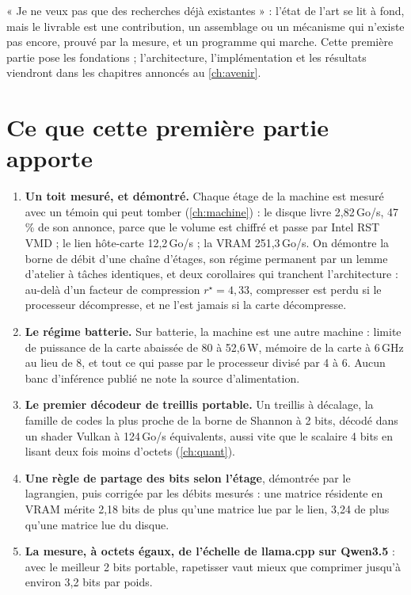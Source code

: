« Je ne veux pas que des recherches déjà existantes » : l'état de l'art se lit à fond, mais le livrable est une contribution, un assemblage ou un mécanisme qui n'existe pas encore, prouvé par la mesure, et un programme qui marche. Cette première partie pose les fondations ; l'architecture, l'implémentation et les résultats viendront dans les chapitres annoncés au \cref{ch:avenir}.

\section{Ce que cette première partie apporte}\label{sec:contributions}

\begin{enumerate}
\item \textbf{Un toit mesuré, et démontré.} Chaque étage de la machine est mesuré avec un témoin qui peut tomber (\cref{ch:machine}) : le disque livre 2,82\,Go/s, 47\,\% de son annonce, parce que le volume est chiffré et passe par Intel RST VMD ; le lien hôte-carte 12,2\,Go/s ; la VRAM 251,3\,Go/s. On démontre la borne de débit d'une chaîne d'étages, son régime permanent par un lemme d'atelier à tâches identiques, et deux corollaires qui tranchent l'architecture : au-delà d'un facteur de compression $r^\star = 4{,}33$, compresser est perdu si le processeur décompresse, et ne l'est jamais si la carte décompresse.
\item \textbf{Le régime batterie.} Sur batterie, la machine est une autre machine : limite de puissance de la carte abaissée de 80 à 52,6\,W, mémoire de la carte à 6\,GHz au lieu de 8, et tout ce qui passe par le processeur divisé par 4 à 6. Aucun banc d'inférence publié ne note la source d'alimentation.
\item \textbf{Le premier décodeur de treillis portable.} Un treillis à décalage, la famille de codes la plus proche de la borne de Shannon à 2 bits, décodé dans un shader Vulkan à 124\,Go/s équivalents, aussi vite que le scalaire 4 bits en lisant deux fois moins d'octets (\cref{ch:quant}).
\item \textbf{Une règle de partage des bits selon l'étage}, démontrée par le lagrangien, puis corrigée par les débits mesurés : une matrice résidente en VRAM mérite 2,18 bits de plus qu'une matrice lue par le lien, 3,24 de plus qu'une matrice lue du disque.
\item \textbf{La mesure, à octets égaux, de l'échelle de llama.cpp sur Qwen3.5} : avec le meilleur 2 bits portable, rapetisser vaut mieux que comprimer jusqu'à environ 3,2 bits par poids.

\end{enumerate}
